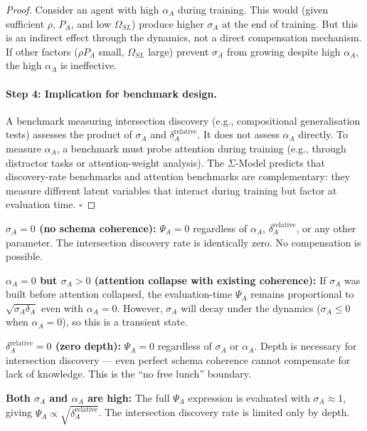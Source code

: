 \begin{proof}
Consider an agent with high $\alpha_A$ during training. This would
(given sufficient $\rho$, $P_A$, and low $\Omega_{SL}$) produce higher
$\sigma_A$ at the end of training. But this is an indirect effect
through the dynamics, not a direct compensation mechanism. If other
factors ($\rho P_A$ small, $\Omega_{SL}$ large) prevent $\sigma_A$
from growing despite high $\alpha_A$, the high $\alpha_A$ is
ineffective.

\paragraph{Step 4: Implication for benchmark design.}
A benchmark measuring intersection discovery (e.g., compositional
generalisation tests) assesses the product of $\sigma_A$ and
$\delta_A^{\text{relative}}$. It does not assess $\alpha_A$ directly.
To measure $\alpha_A$, a benchmark must probe attention during
training (e.g., through distractor tasks or attention-weight
analysis). The $\Sigma$-Model predicts that discovery-rate benchmarks
and attention benchmarks are complementary: they measure different
latent variables that interact during training but factor at
evaluation time. $\square$
\end{proof}

\begin{boundary-case}
\textbf{$\sigma_A = 0$ (no schema coherence):}
$\Psi_A = 0$ regardless of $\alpha_A$, $\delta_A^{\text{relative}}$,
or any other parameter. The intersection discovery rate is identically
zero. No compensation is possible.

\textbf{$\alpha_A = 0$ but $\sigma_A > 0$ (attention collapse with existing coherence):}
If $\sigma_A$ was built before attention collapsed, the evaluation-time
$\Psi_A$ remains proportional to $\sqrt{\sigma_A \delta_A}$ even with
$\alpha_A = 0$. However, $\sigma_A$ will decay under the dynamics
($\dot{\sigma}_A \leq 0$ when $\alpha_A = 0$), so this is a transient
state.

\textbf{$\delta_A^{\text{relative}} = 0$ (zero depth):}
$\Psi_A = 0$ regardless of $\sigma_A$ or $\alpha_A$. Depth is
necessary for intersection discovery — even perfect schema coherence
cannot compensate for lack of knowledge. This is the ``no free lunch''
boundary.

\textbf{Both $\sigma_A$ and $\alpha_A$ are high:}
The full $\Psi_A$ expression is evaluated with $\sigma_A \approx 1$,
giving $\Psi_A \propto \sqrt{\delta_A^{\text{relative}}}$. The
intersection discovery rate is limited only by depth.
\end{boundary-case}

